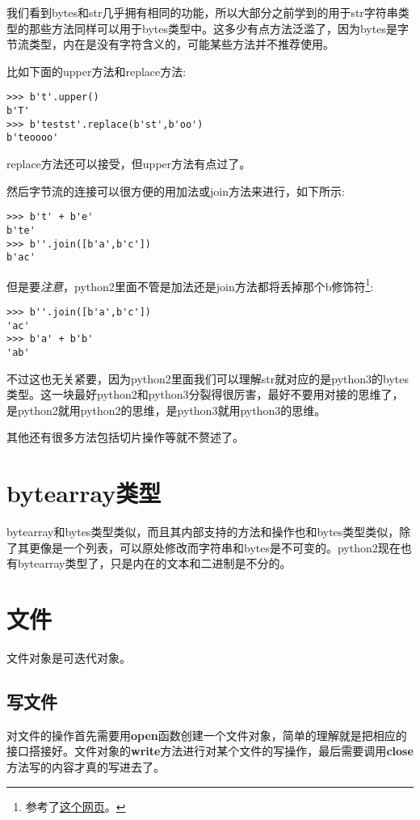 \documentclass[12pt,oneside]{book}
\begin{document}
\begin{common-format}
我们看到bytes和str几乎拥有相同的功能，所以大部分之前学到的用于str字符串类型的那些方法同样可以用于bytes类型中。这多少有点方法泛滥了，因为bytes是字节流类型，内在是没有字符含义的，可能某些方法并不推荐使用。

比如下面的upper方法和replace方法:
\begin{Verbatim}
>>> b't'.upper()
b'T'
>>> b'testst'.replace(b'st',b'oo')
b'teoooo'
\end{Verbatim}

replace方法还可以接受，但upper方法有点过了。

然后字节流的连接可以很方便的用加法或join方法来进行，如下所示:
\begin{Verbatim}
>>> b't' + b'e'
b'te'
>>> b''.join([b'a',b'c'])
b'ac'
\end{Verbatim}

但是要\emph{注意}，python2里面不管是加法还是join方法都将丢掉那个b修饰符\footnote{参考了\href{http://gehrcke.de/2014/02/concatenate-byte-strings-in-python-3/}{这个网页}。}:
\begin{Verbatim}
>>> b''.join([b'a',b'c'])
'ac'
>>> b'a' + b'b'
'ab'
\end{Verbatim}

不过这也无关紧要，因为python2里面我们可以理解str就对应的是python3的bytes类型。这一块最好python2和python3分裂得很厉害，最好不要用对接的思维了，是python2就用python2的思维，是python3就用python3的思维。

其他还有很多方法包括切片操作等就不赘述了。


\section{bytearray类型}
bytearray和bytes类型类似，而且其内部支持的方法和操作也和bytes类型类似，除了其更像是一个列表，可以原处修改而字符串和bytes是不可变的。python2现在也有bytearray类型了，只是内在的文本和二进制是不分的。



\section{文件}
文件对象是可迭代对象。

\subsection{写文件}
对文件的操作首先需要用\textbf{open}函数创建一个文件对象，简单的理解就是把相应的接口搭接好。文件对象的\textbf{write}方法进行对某个文件的写操作，最后需要调用\textbf{close}方法写的内容才真的写进去了。


\end{common-format}
\end{document}
